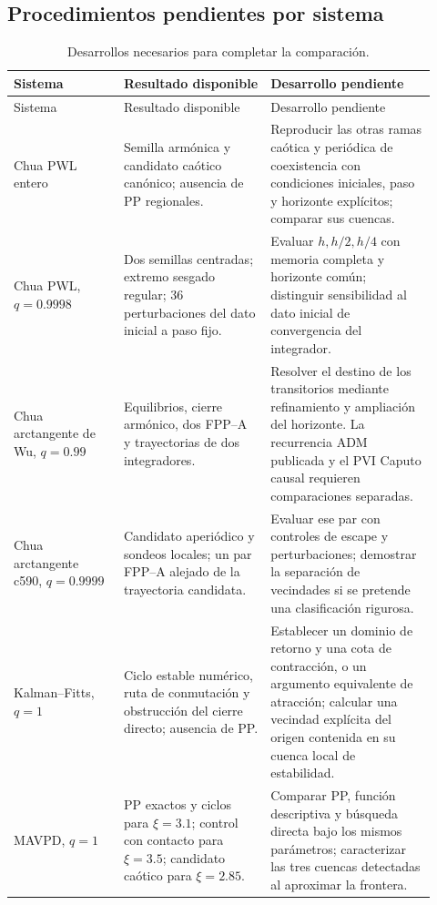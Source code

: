 \subsection{Procedimientos pendientes por sistema}

\begin{longtable}{@{}L{0.24\linewidth}L{0.32\linewidth}L{0.36\linewidth}@{}}
\caption{Desarrollos necesarios para completar la comparación.}
\label{tab:procedimientos-pendientes}\\
\toprule
Sistema & Resultado disponible & Desarrollo pendiente\\
\midrule
\endfirsthead
\toprule
Sistema & Resultado disponible & Desarrollo pendiente\\
\midrule
\endhead
Chua PWL entero
& Semilla armónica y candidato caótico canónico; ausencia de PP regionales.
& Reproducir las otras ramas caótica y periódica de coexistencia con
condiciones iniciales, paso y horizonte explícitos; comparar sus cuencas.\\
Chua PWL, \(q=0.9998\)
& Dos semillas centradas; extremo sesgado regular; 36 perturbaciones del dato
inicial a paso fijo.
& Evaluar \(h,h/2,h/4\) con memoria completa y horizonte común; distinguir
sensibilidad al dato inicial de convergencia del integrador.\\
Chua arctangente de Wu, \(q=0.99\)
& Equilibrios, cierre armónico, dos FPP--A y trayectorias de dos integradores.
& Resolver el destino de los transitorios mediante refinamiento y ampliación
del horizonte. La recurrencia ADM publicada y el PVI Caputo causal requieren
comparaciones separadas.\\
Chua arctangente c590, \(q=0.9999\)
& Candidato aperiódico y sondeos locales; un par FPP--A alejado de la
trayectoria candidata.
& Evaluar ese par con controles de escape y perturbaciones; demostrar la
separación de vecindades si se pretende una clasificación rigurosa.\\
Kalman--Fitts, \(q=1\)
& Ciclo estable numérico, ruta de conmutación y obstrucción del cierre directo;
ausencia de PP.
& Establecer un dominio de retorno y una cota de contracción, o un argumento
equivalente de atracción; calcular una vecindad explícita del origen contenida
en su cuenca local de estabilidad.\\
MAVPD, \(q=1\)
& PP exactos y ciclos para \(\xi=3.1\); control con contacto para
\(\xi=3.5\); candidato caótico para \(\xi=2.85\).
& Comparar PP, función descriptiva y búsqueda directa bajo los mismos
parámetros; caracterizar las tres cuencas detectadas al aproximar la frontera.\\

\end{longtable}
